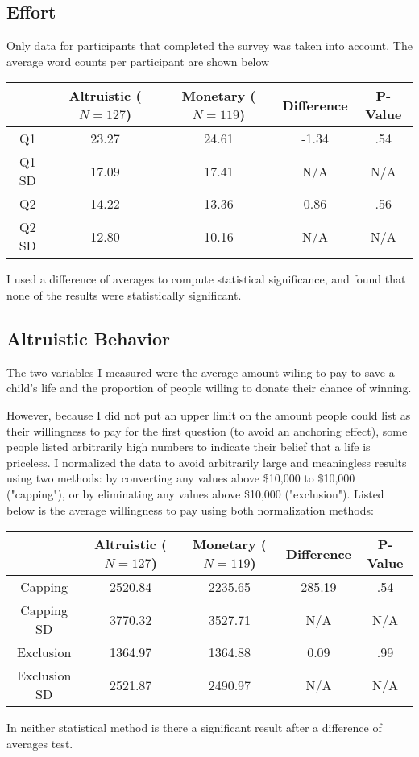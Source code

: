\documentclass[12pt]{article}
\begin{document}
\subsection{Effort}
Only data for participants that completed the survey was taken into account. The average word counts per participant are shown below

\begin{center}
    \begin{tabular}{c| c c | c c}
         & \parbox[t]{2cm}{\textbf{Altruistic}\\($N = 127$)} & \parbox[t]{2cm}{\textbf{Monetary}\\($N = 119$)} & \textbf{Difference} & \textbf{P-Value}\\
         \hline
         Q1 & 23.27 & 24.61 & -1.34 & .54 \\
         Q1 SD & 17.09 & 17.41 & N/A & N/A \\
         Q2 & 14.22 & 13.36 & 0.86 & .56 \\
         Q2 SD & 12.80 & 10.16 & N/A & N/A
    \end{tabular}
\end{center}
I used a difference of averages to compute statistical significance, and found that none of the results were statistically significant. 

\subsection{Altruistic Behavior}
The two variables I measured were the average amount wiling to pay to save a child's life and the proportion of people willing to donate their chance of winning. 

However, because I did not put an upper limit on the amount people could list as their willingness to pay for the first question (to avoid an anchoring effect), some people listed arbitrarily high numbers to indicate their belief that a life is priceless. I normalized the data to avoid arbitrarily large and meaningless results using two methods: by converting any values above \$10,000 to \$10,000 ("capping"), or by eliminating any values above \$10,000 ("exclusion"). Listed below is the average willingness to pay using both normalization methods:

\begin{center}
    \begin{tabular}{c| c c | c c}
         & \parbox[t]{2cm}{\textbf{Altruistic}\\($N = 127$)} & \parbox[t]{2cm}{\textbf{Monetary}\\($N = 119$)} & \textbf{Difference} & \textbf{P-Value}\\
         \hline
         Capping & 2520.84 & 2235.65 & 285.19 & .54\\
         Capping SD & 3770.32 & 3527.71 & N/A & N/A\\
         Exclusion & 1364.97 & 1364.88 & 0.09 & .99\\
         Exclusion SD & 2521.87 & 2490.97 & N/A & N/A
    \end{tabular}
\end{center}
In neither statistical method is there a significant result after a difference of averages test. 
\end{document}
